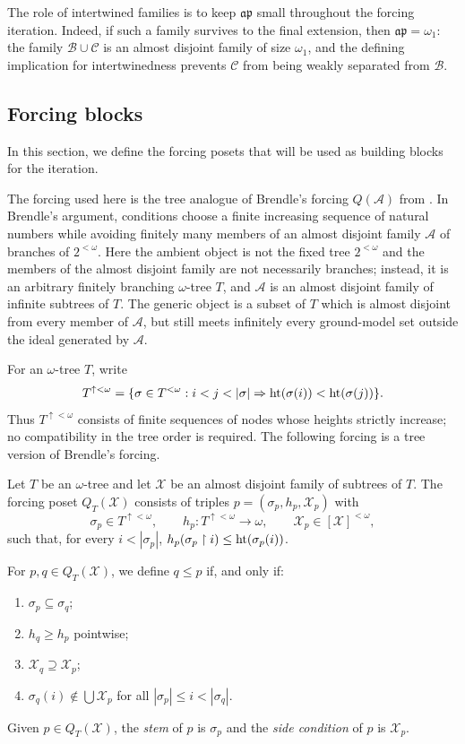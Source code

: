 The role of intertwined families is to keep $\mathfrak{ap}$ small throughout the forcing
iteration.  Indeed, if such a family survives to the final extension, then
$\mathfrak{ap}=\omega_1$: the family $\mathcal B\cup\mathcal C$ is an almost
disjoint family of size $\omega_1$, and the defining implication for intertwinedness
prevents $\mathcal C$ from being weakly separated from $\mathcal B$.


\subsection{Forcing blocks}
\label{subsec:forcing-blocks}

In this section, we define the forcing posets that will be used as building blocks for the iteration.

The forcing used here is the tree analogue of Brendle's forcing
$Q(\mathcal A)$ from \cite{brendle1999dow}.  In Brendle's argument, conditions
choose a finite increasing sequence of natural numbers while avoiding finitely
many members of an almost disjoint family $\mathcal A$ of branches of $2^{<\omega}$.  Here the
ambient object is not the fixed tree $2^{<\omega}$ and the members of the almost
disjoint family are not necessarily branches; instead, it is an arbitrary
finitely branching $\omega$-tree $T$, and $\mathcal A$ is an almost disjoint family of
infinite subtrees of $T$. The generic object is a subset of $T$
which is almost disjoint from every member of $\mathcal A$, but still meets
infinitely every ground-model set outside the ideal generated by $\mathcal A$.

For an $\omega$-tree $T$, write
\[
  T^{\uparrow<\omega}
  =
  \{\sigma\in T^{<\omega}:
    i<j<|\sigma|\Rightarrow
    \htt(\sigma(i))<\htt(\sigma(j))\}.
\]
Thus $T^{\uparrow<\omega}$ consists of finite sequences of nodes whose heights
strictly increase; no compatibility in the tree order is required.  The
following forcing is a tree version of Brendle's forcing.

\begin{definition}\label{def:QT}
Let $T$ be an $\omega$-tree and let $\mathcal X$ be an almost disjoint family of subtrees of $T$.
The forcing poset $Q_T(\mathcal X)$ consists of triples $p=(\sigma_p,h_p,\mathcal X_p)$ with
\[
  \sigma_p\in T^{\uparrow<\omega},\qquad
  h_p:T^{\uparrow<\omega}\to\omega,
  \qquad
  \mathcal X_p\in[\mathcal X]^{<\omega},
\]
such that, for every $i<|\sigma_p|$, $h_p(\sigma_p\restriction i)\leq\operatorname{ht}(\sigma_p(i))$.

For $p, q \in Q_T(\mathcal X)$, we define
$q\leq p$ if, and only if:
\begin{enumerate}[label=(\arabic*)]
    \item $\sigma_p\subseteq \sigma_q$;
    \item $h_q\geq h_p$ pointwise;
    \item $\mathcal X_q\supseteq\mathcal X_p$;
    \item $\sigma_q(i)\notin\bigcup \mathcal X_p$ for all
    $|\sigma_p|\leq i<|\sigma_q|$.
\end{enumerate}
Given $p\in Q_T(\mathcal X)$, the \emph{stem} of $p$ is $\sigma_p$ and the \emph{side condition} of $p$ is $\mathcal X_p$.
\end{definition}

